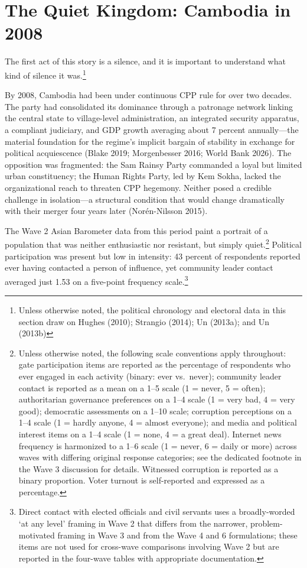 \documentclass[
  12pt,
  letterpaper]{article}
\begin{document}
\section{The Quiet Kingdom: Cambodia in
2008}\label{the-quiet-kingdom-cambodia-in-2008}

The first act of this story is a silence, and it is important to
understand what kind of silence it was.\footnote{Unless otherwise noted,
  the political chronology and electoral data in this section draw on
  Hughes (2010); Strangio (2014); Un (2013a); and Un (2013b)}

By 2008, Cambodia had been under continuous CPP rule for over two
decades. The party had consolidated its dominance through a patronage
network linking the central state to village-level administration, an
integrated security apparatus, a compliant judiciary, and GDP growth
averaging about 7 percent annually---the material foundation for the
regime's implicit bargain of stability in exchange for political
acquiescence (Blake 2019; Morgenbesser 2016; World Bank 2026). The
opposition was fragmented: the Sam Rainsy Party commanded a loyal but
limited urban constituency; the Human Rights Party, led by Kem Sokha,
lacked the organizational reach to threaten CPP hegemony. Neither posed
a credible challenge in isolation---a structural condition that would
change dramatically with their merger four years later (Norén-Nilsson
2015).

The Wave 2 Asian Barometer data from this period paint a portrait of a
population that was neither enthusiastic nor resistant, but simply
quiet.\footnote{Unless otherwise noted, the following scale conventions
  apply throughout: gate participation items are reported as the
  percentage of respondents who ever engaged in each activity (binary:
  ever vs.~never); community leader contact is reported as a mean on a
  1--5 scale (1 = never, 5 = often); authoritarian governance
  preferences on a 1--4 scale (1 = very bad, 4 = very good); democratic
  assessments on a 1--10 scale; corruption perceptions on a 1--4 scale
  (1 = hardly anyone, 4 = almost everyone); and media and political
  interest items on a 1--4 scale (1 = none, 4 = a great deal). Internet
  news frequency is harmonized to a 1--6 scale (1 = never, 6 = daily or
  more) across waves with differing original response categories; see
  the dedicated footnote in the Wave 3 discussion for details. Witnessed
  corruption is reported as a binary proportion. Voter turnout is
  self-reported and expressed as a percentage.} Political participation
was present but low in intensity: 43 percent of respondents reported
ever having contacted a person of influence, yet community leader
contact averaged just 1.53 on a five-point frequency scale.\footnote{Direct
  contact with elected officials and civil servants uses a
  broadly-worded `at any level' framing in Wave 2 that differs from the
  narrower, problem-motivated framing in Wave 3 and from the Wave 4 and
  6 formulations; these items are not used for cross-wave comparisons
  involving Wave 2 but are reported in the four-wave tables with
  appropriate documentation.}
\end{document}
